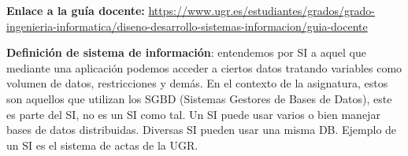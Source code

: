 \documentclass[12pt]{report} %
\begin{document}
\begin{center}
\textbf{Enlace a la guía docente:} \href{https://www.ugr.es/estudiantes/grados/grado-ingenieria-informatica/diseno-desarrollo-sistemas-informacion/guia-docente}{https://www.ugr.es/estudiantes/grados/grado-ingenieria-informatica/diseno-desarrollo-sistemas-informacion/guia-docente}
\end{center}

\textbf{Definición de sistema de información}: entendemos por SI a aquel
que mediante una aplicación podemos acceder a ciertos datos tratando
variables como volumen de datos, restricciones y demás. En el contexto
de la asignatura, estos son aquellos que utilizan los SGBD (Sistemas
Gestores de Bases de Datos), este es parte del SI, no es un SI como tal.
Un SI puede usar varios o bien manejar bases de datos distribuidas.
Diversas SI pueden usar una misma DB. Ejemplo de un SI es el sistema de
actas de la UGR.


\end{document}
